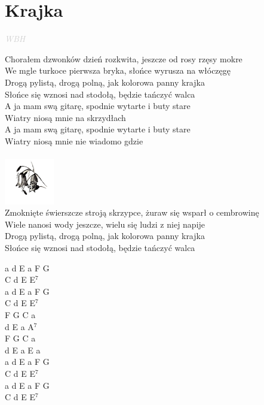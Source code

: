 \documentclass[a5paper, 10pt]{book}
\begin{document}
\section{Krajka}\textcolor{lightgray}{\textit{WBH}}\vspace*{2mm}\\
\begin{minipage}[t]{0.87\textwidth}
Chorałem dzwonków dzień rozkwita, jeszcze od rosy rzęsy mokre \\
We mgle turkoce pierwsza bryka, słońce wyrusza na włóczęgę\\
Drogą pylistą, drogą polną, jak kolorowa panny krajka\\
Słońce się wznosi nad stodołą, będzie tańczyć walca\\

\hspace*{5mm}A ja mam swą gitarę, spodnie wytarte i buty stare\\
\hspace*{5mm}Wiatry niosą mnie na skrzydłach\\
\hspace*{5mm}A ja mam swą gitarę, spodnie wytarte i buty stare\\
\hspace*{5mm}Wiatry niosą mnie nie wiadomo gdzie\\
\vspace*{5mm}\\
\includegraphics[height=2cm, right]{images/krajka.png}\vspace*{-2.55cm}\\
Zmoknięte świerszcze stroją skrzypce, żuraw się wsparł o cembrowinę\\
Wiele nanosi wody jeszcze, wielu się ludzi z niej napije\\
Drogą pylistą, drogą polną, jak kolorowa panny krajka\\
Słońce się wznosi nad stodołą, będzie tańczyć walca\\
\end{minipage}
\begin{minipage}[t]{0.13\textwidth}
a d E a F G\\
C d E E$^7$\\
a d E a F G\\
C d E E$^7$\\

F G C a\\
d E a A$^7$\\
F G C a\\
d E a E a\\

a d E a F G\\
C d E E$^7$\\
a d E a F G\\
C d E E$^7$\\
\end{minipage}
\end{document}
